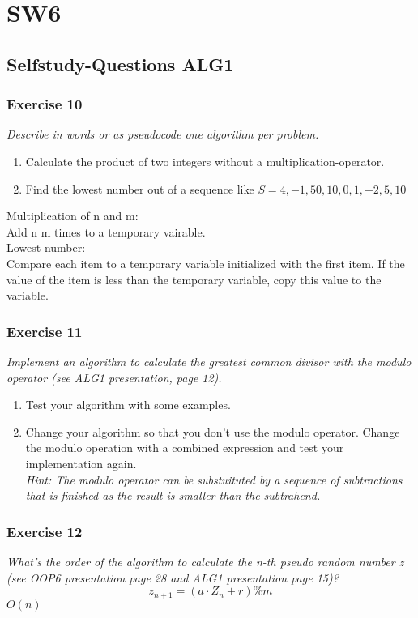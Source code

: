 \section{SW6}
\subsection{Selfstudy-Questions ALG1}

\subsubsection*{Exercise 10}
\textit{Describe in words or as pseudocode one algorithm per problem.}
\begin{enumerate}[label={(\alph*)}]
	\item Calculate the product of two integers without a multiplication-operator.
	\item Find the lowest number out of a sequence like $S = {4,-1,50,10,0,1,-2,5,10}$
\end{enumerate}
Multiplication of n and m: \\
Add n m times to a temporary vairable. \\
Lowest number: \\
Compare each item to a temporary variable initialized with the first item. If 
the value of the item is less than the temporary variable, copy this value to 
the variable. 

\subsubsection*{Exercise 11}
\textit{Implement an algorithm to calculate the greatest common divisor
with the modulo operator (see ALG1 presentation, page 12).}
\begin{enumerate}[label={(\alph*)}]
	\item Test your algorithm with some examples.
	\item Change your algorithm so that you don't use the modulo operator. 
		Change the modulo operation with a combined expression and test 
		your implementation again. \\
		\textit{Hint: The modulo operator can be substuituted by a 
			sequence of subtractions that is finished as the 
			result is smaller than the subtrahend.}
\end{enumerate}

\subsubsection*{Exercise 12}
\textit{What's the order of the algorithm to calculate the n-th pseudo random 
number z (see OOP6 presentation page 28 and ALG1 presentation page 15)?}
\[ z_{n+1} = (a \cdot Z_n + r) \% m \]
$O(n)$